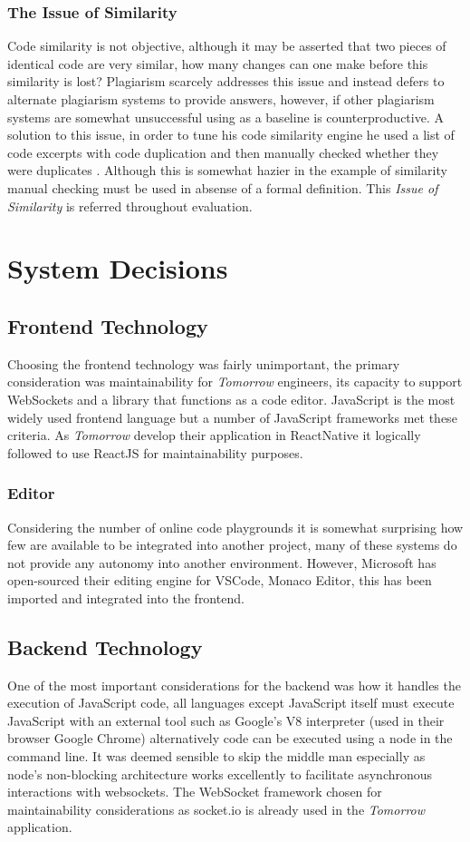\documentclass[jou,apacite]{apa6}
\begin{document}
\subsubsection{The Issue of Similarity}
Code similarity is not objective, although it may be asserted that two pieces of identical code are very similar, how many changes can one make before this similarity is lost? Plagiarism scarcely addresses this issue and instead defers to alternate plagiarism systems to provide answers, however, if other plagiarism systems are somewhat unsuccessful using as  a baseline is counterproductive. A solution to this issue, in order to tune his code similarity engine he used a list of code excerpts with code duplication and then manually checked whether they were duplicates \cite{Krinke2002}. Although this is somewhat hazier in the example of similarity manual checking must be used in absense of a formal definition. This \textit{Issue of Similarity} is referred throughout evaluation.

\clearpage

\section{System Decisions}
\subsection{Frontend Technology}
Choosing the frontend technology was fairly unimportant, the primary consideration was maintainability for \textit{Tomorrow} engineers, its capacity to support WebSockets and a library that functions as a code editor. JavaScript is the most widely used frontend language but a number of JavaScript frameworks met these criteria. As \textit{Tomorrow} develop their application in ReactNative it logically followed to use ReactJS for maintainability purposes. 
\subsubsection{Editor}
Considering the number of online code playgrounds it is somewhat surprising how few are available to be integrated into another project, many of these systems do not provide any autonomy into another environment. However, Microsoft has open-sourced their editing engine for VSCode, Monaco Editor, this has been imported and integrated into the frontend. 
\subsection{Backend Technology}
One of the most important considerations for the backend was how it handles the execution of JavaScript code, all languages except JavaScript itself must execute JavaScript with an external tool such as Google’s V8 interpreter (used in their browser Google Chrome) alternatively code can be executed using a node in the command line. It was deemed sensible to skip the middle man especially as node's non-blocking architecture works excellently to facilitate asynchronous interactions with websockets. The WebSocket framework chosen for maintainability considerations as socket.io is already used in the \textit{Tomorrow} application.
\end{document}
